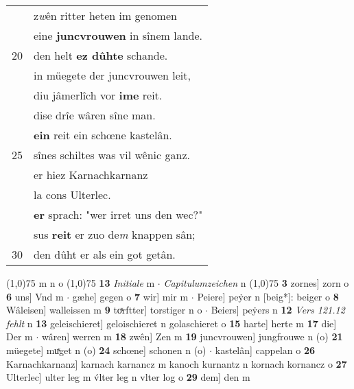 \documentclass[8pt,a4paper,notitlepage]{article}
\begin{document}
\begin{table}[ht]
\begin{minipage}[t]{0.5\linewidth}
\begin{tabular}{rl}
 & z\textit{w}ên ritter heten im genomen\\ 
 & eine \textbf{juncvrouwen} in sînem lande.\\ 
20 & den helt \textbf{ez dûhte} schande.\\ 
 & in müegete der juncvrouwen leit,\\ 
 & diu jâmerlîch vor \textbf{ime} reit.\\ 
 & dise drîe wâren sîne man.\\ 
 & \textbf{ein} reit ein schœne kastelân.\\ 
25 & sînes schiltes was vil wênic ganz.\\ 
 & er hiez Karnachkarnanz\\ 
 & la cons Ulterlec.\\ 
 & \textbf{er} sprach: "wer irret uns den wec?"\\ 
 & sus \textbf{reit} er zuo de\textit{m} knappen sân;\\ 
30 & den dûht er als ein got getân.\\ 
\end{tabular}
\scriptsize
\line(1,0){75} \newline
m n o \newline
\line(1,0){75} \newline
\textbf{13} \textit{Initiale} m   $\cdot$ \textit{Capitulumzeichen} n  \newline
\line(1,0){75} \newline
\textbf{3} zornes] zorn o \textbf{6} uns] Vnd m  $\cdot$ gæhe] gegen o \textbf{7} wir] mir m  $\cdot$ Peiere] peẏer n [beig*]: beiger o \textbf{8} Wâleisen] walleissen m \textbf{9} toͯrftter] torstiger n o  $\cdot$ Beiers] peẏers n \textbf{12} \textit{Vers 121.12 fehlt} n  \textbf{13} geleischieret] geloischieret n golaschieret o \textbf{15} harte] herte m \textbf{17} die] Der m  $\cdot$ wâren] werren m \textbf{18} zwên] Zen m \textbf{19} juncvrouwen] jungfrouwe n (o) \textbf{21} müegete] muͯget n (o) \textbf{24} schœne] schonen n (o)  $\cdot$ kastelân] cappelan o \textbf{26} Karnachkarnanz] karnach karnancz m kanoch kurnantz n kornach kornancz o \textbf{27} Ulterlec] ulter leg m v́lter leg n vlter log o \textbf{29} dem] den m \newline
\end{minipage}
\end{table}
\newpage
\end{document}
